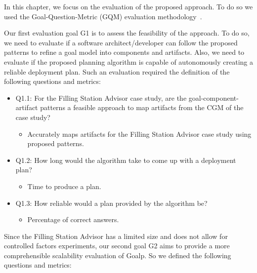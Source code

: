 \label{sec:evaluation}

In this chapter, we focus on the evaluation of the proposed approach.
To do so we used the Goal-Question-Metric (GQM) evaluation methodology~\cite{basili_goal_1994}.

Our first evaluation goal G1 is to assess the feasibility of the approach. To do so, we need to evaluate if a software architect/developer can follow the proposed patterns to refine a goal model into components and artifacts. Also, we need to evaluate if the proposed planning algorithm is capable of autonomously creating a reliable deployment plan.
Such an evaluation required the definition of the following questions and metrics:

\begin{itemize}
  \item Q1.1: For the Filling Station Advisor case study, are the goal-component-artifact patterns a feasible approach to map artifacts from the CGM of the case study?
  \begin{itemize}
    \item Accurately maps artifacts for the Filling Station Advisor case study using proposed patterns.
  \end{itemize}

  \item Q1.2: How long would the algorithm take to come up with a deployment plan?
  \begin{itemize}
    \item Time to produce a plan.
  \end{itemize}

  \item Q1.3: How reliable would a plan provided
  by the algorithm be?
  \begin{itemize}
    \item Percentage of correct answers.
  \end{itemize}

\end{itemize}

Since the Filling Station Advisor has a limited size and does not allow for controlled factors experiments, our second goal G2 aims to provide a more comprehensible scalability evaluation of Goalp. So we defined the following questions and metrics:

